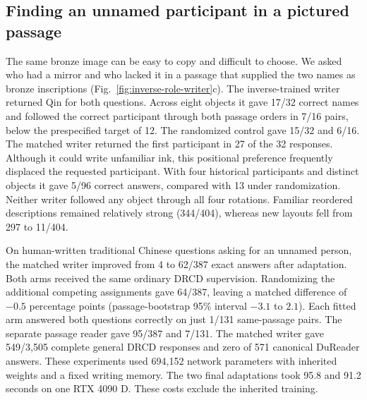 \documentclass[12pt,a4paper]{article}
\providecommand{\DIFadd}[1]{{\protect\color{blue} \sf #1}} %
\begin{document}
\subsection*{\DIFadd{Finding an unnamed participant in a pictured passage}}
\DIFadd{The same bronze image can be easy to copy and difficult to choose. We asked who had a mirror and who lacked it in a passage that supplied the two names as bronze inscriptions (Fig.~\ref{fig:inverse-role-writer}c). The inverse-trained writer returned Qin for both questions. Across eight objects it gave 17/32 correct names and followed the correct participant through both passage orders in 7/16 pairs, below the prespecified target of 12. The randomized control gave 15/32 and 6/16. The matched writer returned the first participant in 27 of the 32 responses. Although it could write unfamiliar ink, this positional preference frequently displaced the requested participant. With four historical participants and distinct objects it gave 5/96 correct answers, compared with 13 under randomization. Neither writer followed any object through all four rotations. Familiar reordered descriptions remained relatively strong (344/404), whereas new layouts fell from 297 to 11/404.
}

\DIFadd{On human-written traditional Chinese questions asking for an unnamed person, the matched writer improved from 4 to 62/387 exact answers after adaptation. Both arms received the same ordinary DRCD supervision. Randomizing the additional competing assignments gave 64/387, leaving a matched difference of $-0.5$ percentage points (passage-bootstrap 95\% interval $-3.1$ to $2.1$). Each fitted arm answered both questions correctly on just 1/131 same-passage pairs. The separate passage reader gave 95/387 and 7/131. The matched writer gave 549/3,505 complete general DRCD responses and zero of 571 canonical DuReader answers. These experiments used 694,152 network parameters with inherited weights and a fixed writing memory. The two final adaptations took 95.8 and 91.2 seconds on one RTX 4090 D. These costs exclude the inherited training.
}
\end{document}
